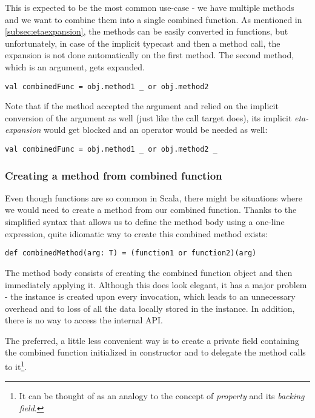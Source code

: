 This is expected to be the most common use-case - we have multiple methods and we want to combine them into a single combined function. As mentioned in \ref{subsec:etaexpansion}, the methods can be easily converted in functions, but unfortunately, in case of the implicit typecast and then a method call, the expansion is not done automatically on the first method. The second method, which is an argument, gets expanded.

\lstset{style=Scala}
\begin{lstlisting}
val combinedFunc = obj.method1 _ or obj.method2
\end{lstlisting}

Note that if the  method accepted the  argument and relied on the implicit conversion of the argument as well (just like the call target does), its implicit \textit{eta-expansion} would get blocked and an operator \inlinecode{\_} would be needed as well:

\lstset{style=Scala}
\begin{lstlisting}
val combinedFunc = obj.method1 _ or obj.method2 _
\end{lstlisting}

\subsubsection{Creating a method from combined function}
\label{subsubsec:method_from_combined_func}

Even though functions are so common in Scala, there might be situations where we would need to create a method from our combined function. Thanks to the simplified syntax that allows us to define the method body using a one-line expression, quite idiomatic way to create this combined method exists:

\lstset{style=Scala}
\begin{lstlisting}
def combinedMethod(arg: T) = (function1 or function2)(arg)
\end{lstlisting}

The method body consists of creating the combined function object and then immediately applying it. Although this does look elegant, it has a major problem - the  instance is created upon every invocation, which leads to an unnecessary overhead and to loss of all the data locally stored in the instance. In addition, there is no way to access the  internal API.

The preferred, a little less convenient way is to create a private field containing the combined function initialized in constructor and to delegate the method calls to it\footnote{It can be thought of as an analogy to the concept of \textit{property} and its \textit{backing field}.}.
 
